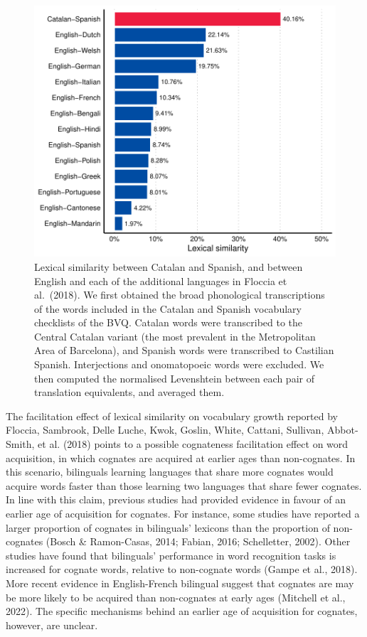 \documentclass[
  12pt,
  b5paperpaper,
  twoside]{scrreprt}
\begin{document}
\begin{figure}

{\centering \includegraphics{chapters/01-introduction_files/figure-pdf/fig-cat-spa-distance-1.pdf}

}

\caption{\label{fig-cat-spa-distance}Lexical similarity between Catalan
and Spanish, and between English and each of the additional languages in
Floccia et al.~(2018). We first obtained the broad phonological
transcriptions of the words included in the Catalan and Spanish
vocabulary checklists of the BVQ. Catalan words were transcribed to the
Central Catalan variant (the most prevalent in the Metropolitan Area of
Barcelona), and Spanish words were transcribed to Castilian Spanish.
Interjections and onomatopoeic words were excluded. We then computed the
normalised Levenshtein between each pair of translation equivalents, and
averaged them.}

\end{figure}

The facilitation effect of lexical similarity on vocabulary growth
reported by Floccia, Sambrook, Delle Luche, Kwok, Goslin, White,
Cattani, Sullivan, Abbot‐Smith, et al. (2018) points to a possible
cognateness facilitation effect on word acquisition, in which cognates
are acquired at earlier ages than non-cognates. In this scenario,
bilinguals learning languages that share more cognates would acquire
words faster than those learning two languages that share fewer
cognates. In line with this claim, previous studies had provided
evidence in favour of an earlier age of acquisition for cognates. For
instance, some studies have reported a larger proportion of cognates in
bilinguals' lexicons than the proportion of non-cognates (Bosch \&
Ramon-Casas, 2014; Fabian, 2016; Schelletter, 2002). Other studies have
found that bilinguals' performance in word recognition tasks is
increased for cognate words, relative to non-cognate words (Gampe et
al., 2018). More recent evidence in English-French bilingual suggest
that cognates are may be more likely to be acquired than non-cognates at
early ages (Mitchell et al., 2022). The specific mechanisms behind an
earlier age of acquisition for cognates, however, are unclear.
\end{document}
